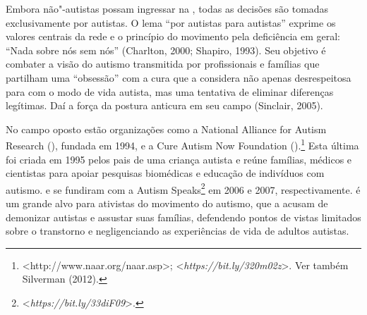 Embora não"-autistas possam ingressar na , todas as decisões são
tomadas exclusivamente por autistas. O lema ``por autistas para
autistas'' exprime os valores centrais da rede e o princípio do
movimento pela deficiência em geral: ``Nada sobre nós sem nós''
(Charlton, 2000; Shapiro, 1993). Seu objetivo é combater a visão do
autismo transmitida por profissionais e famílias que partilham uma
``obsessão'' com a cura que a  considera não apenas desrespeitosa
para com o modo de vida autista, mas uma tentativa de eliminar
diferenças legítimas. Daí a força da postura anticura em seu campo
(Sinclair, 2005).

No campo oposto estão organizações como a National Alliance for Autism
Research (), fundada em 1994, e a Cure Autism Now Foundation
().\footnote[11]{\textless{}http://www.naar.org/naar.asp\textgreater{};
\textless{}\emph{https://bit.ly/320m02z}\textgreater{}.
Ver também Silverman (2012).} Esta última foi criada em 1995 pelos pais de
uma criança autista e reúne famílias, médicos e cientistas para apoiar
pesquisas biomédicas e educação de indivíduos com autismo.  e 
se fundiram com a Autism Speaks\footnote[12]{\textless{}\emph{https://bit.ly/33diF09}\textgreater{}.} em 2006 e 2007, respectivamente.  é um
grande alvo para ativistas do movimento do autismo, que a acusam de
demonizar autistas e assustar suas famílias, defendendo pontos de vistas
limitados sobre o transtorno e negligenciando as experiências de vida de
adultos autistas.

